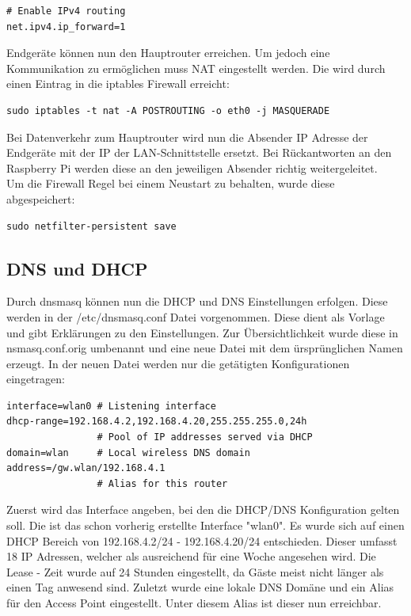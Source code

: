 \documentclass[a4paper,11pt,singlespacing]{article}
\begin{document}
                \begin{lstlisting}
# Enable IPv4 routing
net.ipv4.ip_forward=1
                \end{lstlisting} 
                Endgeräte können nun den Hauptrouter erreichen. Um jedoch eine Kommunikation zu ermöglichen muss NAT eingestellt werden. Die wird durch einen Eintrag in die iptables Firewall erreicht: \\
            
                \begin{lstlisting}
sudo iptables -t nat -A POSTROUTING -o eth0 -j MASQUERADE
                \end{lstlisting} 
       
                Bei Datenverkehr zum Hauptrouter wird nun die Absender IP Adresse der Endgeräte mit der IP der LAN-Schnittstelle ersetzt. Bei Rückantworten an den Raspberry Pi werden diese an den jeweiligen Absender richtig weitergeleitet.\\
            
                Um die Firewall Regel bei einem Neustart zu behalten, wurde diese abgespeichert:\\
                
                \begin{lstlisting}
sudo netfilter-persistent save
                \end{lstlisting}    
            \subsection{DNS und DHCP}
                Durch dnsmasq können nun die DHCP und DNS Einstellungen erfolgen. Diese werden in der /etc/dnsmasq.conf Datei vorgenommen. Diese dient als Vorlage und gibt Erklärungen zu den Einstellungen. Zur Übersichtlichkeit wurde diese in nsmasq.conf.orig umbenannt und eine neue Datei mit dem ürsprünglichen Namen erzeugt. In der neuen Datei werden nur die getätigten Konfigurationen eingetragen:
            
            
                \begin{lstlisting}
interface=wlan0 # Listening interface
dhcp-range=192.168.4.2,192.168.4.20,255.255.255.0,24h
                # Pool of IP addresses served via DHCP
domain=wlan     # Local wireless DNS domain
address=/gw.wlan/192.168.4.1
                # Alias for this router
                \end{lstlisting}  
                Zuerst wird das Interface angeben, bei den die DHCP/DNS Konfiguration gelten soll. Die ist das schon vorherig erstellte Interface "wlan0". Es wurde sich auf einen DHCP Bereich von 192.168.4.2/24 - 192.168.4.20/24 entschieden. Dieser umfasst 18 IP Adressen, welcher als ausreichend für eine Woche angesehen wird. Die Lease - Zeit wurde auf 24 Stunden eingestellt, da Gäste meist nicht länger als einen Tag anwesend sind.
                Zuletzt wurde eine lokale DNS Domäne und ein Alias für den Access Point eingestellt. Unter diesem Alias ist dieser nun erreichbar.
\end{document}
